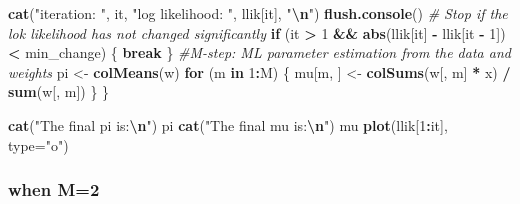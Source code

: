\documentclass[
]{article}
\newenvironment{Shaded}{\begin{snugshade}}{\end{snugshade}}
\newcommand{\AttributeTok}[1]{\textcolor[rgb]{0.13,0.29,0.53}{#1}}
\newcommand{\CommentTok}[1]{\textcolor[rgb]{0.56,0.35,0.01}{\textit{#1}}}
\newcommand{\ControlFlowTok}[1]{\textcolor[rgb]{0.13,0.29,0.53}{\textbf{#1}}}
\newcommand{\DecValTok}[1]{\textcolor[rgb]{0.00,0.00,0.81}{#1}}
\newcommand{\FunctionTok}[1]{\textcolor[rgb]{0.13,0.29,0.53}{\textbf{#1}}}
\newcommand{\NormalTok}[1]{#1}
\newcommand{\OtherTok}[1]{\textcolor[rgb]{0.56,0.35,0.01}{#1}}
\newcommand{\SpecialCharTok}[1]{\textcolor[rgb]{0.81,0.36,0.00}{\textbf{#1}}}
\newcommand{\StringTok}[1]{\textcolor[rgb]{0.31,0.60,0.02}{#1}}
\begin{document}
\begin{Shaded}
\begin{Highlighting}[]
  \FunctionTok{cat}\NormalTok{(}\StringTok{"iteration: "}\NormalTok{, it, }\StringTok{"log likelihood: "}\NormalTok{, llik[it], }\StringTok{"}\SpecialCharTok{\textbackslash{}n}\StringTok{"}\NormalTok{)}
  \FunctionTok{flush.console}\NormalTok{()}
  \CommentTok{\# Stop if the lok likelihood has not changed significantly}
  \ControlFlowTok{if}\NormalTok{ (it }\SpecialCharTok{\textgreater{}} \DecValTok{1} \SpecialCharTok{\&\&} \FunctionTok{abs}\NormalTok{(llik[it] }\SpecialCharTok{{-}}\NormalTok{ llik[it }\SpecialCharTok{{-}} \DecValTok{1}\NormalTok{]) }\SpecialCharTok{\textless{}}\NormalTok{ min\_change) \{}
    \ControlFlowTok{break}
\NormalTok{  \}}
  \CommentTok{\#M{-}step: ML parameter estimation from the data and weights}
\NormalTok{  pi }\OtherTok{\textless{}{-}} \FunctionTok{colMeans}\NormalTok{(w)}
  \ControlFlowTok{for}\NormalTok{ (m }\ControlFlowTok{in} \DecValTok{1}\SpecialCharTok{:}\NormalTok{M) \{}
\NormalTok{    mu[m, ] }\OtherTok{\textless{}{-}} \FunctionTok{colSums}\NormalTok{(w[, m] }\SpecialCharTok{*}\NormalTok{ x) }\SpecialCharTok{/} \FunctionTok{sum}\NormalTok{(w[, m])}
\NormalTok{  \}}
\NormalTok{\}}

\FunctionTok{cat}\NormalTok{(}\StringTok{"The final pi is:}\SpecialCharTok{\textbackslash{}n}\StringTok{"}\NormalTok{)}
\NormalTok{pi}
\FunctionTok{cat}\NormalTok{(}\StringTok{"The final mu is:}\SpecialCharTok{\textbackslash{}n}\StringTok{"}\NormalTok{)}
\NormalTok{mu}
\FunctionTok{plot}\NormalTok{(llik[}\DecValTok{1}\SpecialCharTok{:}\NormalTok{it], }\AttributeTok{type=}\StringTok{"o"}\NormalTok{)}
\end{Highlighting}
\end{Shaded}

\hypertarget{when-m2-1}{%
\subsubsection{when M=2}\label{when-m2-1}}
\end{document}
